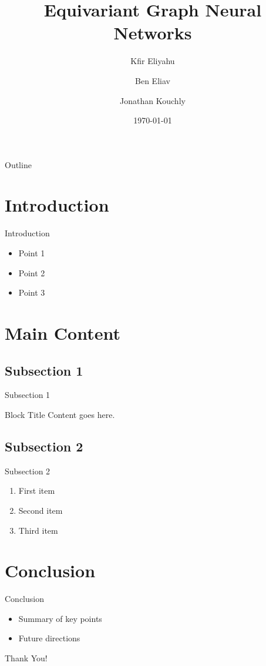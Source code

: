 \documentclass{beamer}
\title[Short Title]{Equivariant Graph Neural Networks}
\author[Author1, Author2, Author3]{Kfir Eliyahu \and Ben Eliav \and Jonathan Kouchly}
\institute[Your Institution]{Technion - Israel Institute of Technology}
\date{\today} %
\begin{document}
\begin{frame}
    \titlepage
\end{frame}

\begin{frame}{Outline}
    \tableofcontents
\end{frame}

\section{Introduction}
\begin{frame}{Introduction}
    \begin{itemize}
        \item Point 1
        \item Point 2
        \item Point 3
    \end{itemize}
\end{frame}

\section{Main Content}
\subsection{Subsection 1}
\begin{frame}{Subsection 1}
    \begin{block}{Block Title}
        Content goes here.
    \end{block}
\end{frame}

\subsection{Subsection 2}
\begin{frame}{Subsection 2}
    \begin{enumerate}
        \item First item
        \item Second item
        \item Third item
    \end{enumerate}
\end{frame}

\section{Conclusion}
\begin{frame}{Conclusion}
    \begin{itemize}
        \item Summary of key points
        \item Future directions
    \end{itemize}
\end{frame}

\begin{frame}[plain]
    \centering
    \Huge Thank You!
\end{frame}
\end{document}
